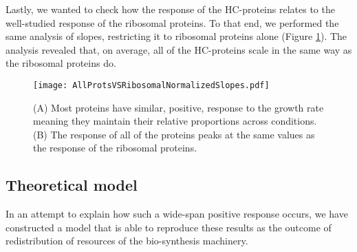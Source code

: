 \documentclass[notitlepage]{article}
\begin{document}
Lastly, we wanted to check how the response of the HC-proteins relates to the well-studied response of the ribosomal proteins.
To that end, we performed the same analysis of slopes, restricting it to ribosomal proteins alone (Figure \ref{fig:globalfit}).
The analysis revealed that, on average, all of the HC-proteins scale in the same way as the ribosomal proteins do.

\begin{figure}[h]
\centering
\texttt{[image: AllProtsVSRibosomalNormalizedSlopes.pdf]}
\caption{
    (A) Most proteins have similar, positive, response to the growth rate meaning they maintain their relative proportions across conditions.
    (B) The response of all of the proteins peaks at the same values as the response of the ribosomal proteins.
}
\label{fig:globalfit}
\end{figure}
\subsection{Theoretical model}
In an attempt to explain how such a wide-span positive response occurs, we have constructed a model that is able to reproduce these results as the outcome of redistribution of resources of the bio-synthesis machinery.
\end{document}
